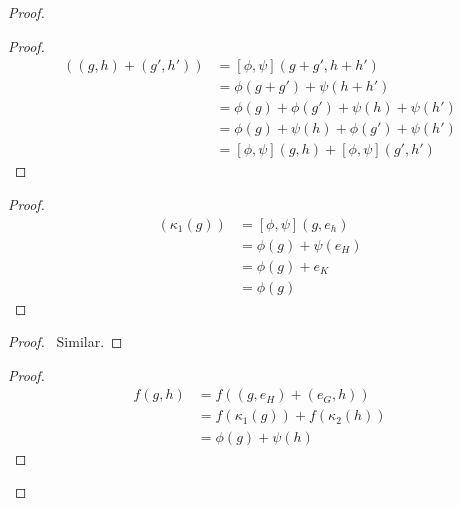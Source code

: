 \documentclass{book}
\let\qed\relax
\theoremstyle{definition}
\begin{document}
\begin{proof}
    \pf
    \begin{proof}
        \pf
        \begin{align*}
            [\phi,\psi]((g,h) + (g',h')) & = [\phi,\psi](g + g', h + h')             \\
                                         & = \phi(g + g') + \psi(h + h')             \\
                                         & = \phi(g) + \phi(g') + \psi(h) + \psi(h') \\
                                         & = \phi(g) + \psi(h) + \phi(g') + \psi(h') \\
                                         & = [\phi,\psi](g,h) + [\phi,\psi](g',h')
        \end{align*}
    \end{proof}
    \begin{proof}
        \pf
        \begin{align*}
            [\phi,\psi](\kappa_1(g)) & = [\phi,\psi](g,e_h)  \\
                                     & = \phi(g) + \psi(e_H) \\
                                     & = \phi(g) + e_K       \\
                                     & = \phi(g)
        \end{align*}
    \end{proof}
    \begin{proof}
        \pf\ Similar.
    \end{proof}
    \begin{proof}
        \pf
        \begin{align*}
            f(g,h) & = f((g,e_H) + (e_G,h))            \\
                   & = f(\kappa_1(g)) + f(\kappa_2(h)) \\
                   & = \phi(g) + \psi(h)
        \end{align*}
    \end{proof}
    \qed
\end{proof}
\end{document}
